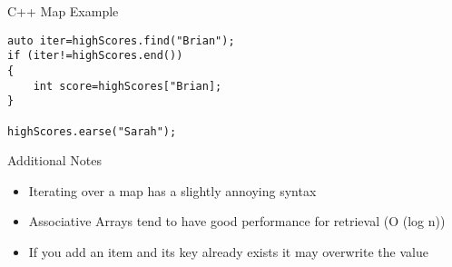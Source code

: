 \begin{frame}[fragile]{C++ Map
	Example}
\begin{lstlisting}
auto iter=highScores.find("Brian");
if (iter!=highScores.end())
{
	int score=highScores["Brian];
}

highScores.earse("Sarah");
\end{lstlisting}
\end{frame}

\begin{frame}{Additional Notes}
\begin{itemize}
	\pause \item Iterating over a map has a slightly annoying syntax
	\pause \item Associative Arrays tend to have good performance for retrieval (O (log n))
	\pause \item If you add an item and its key already exists it may overwrite the value
\end{itemize}
\end{frame}
